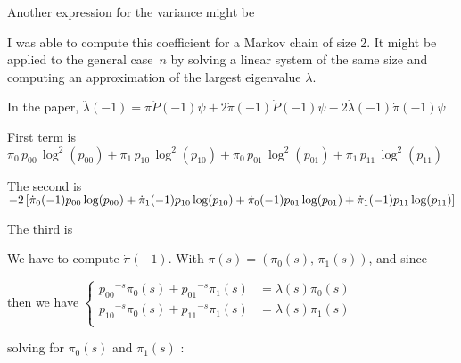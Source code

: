 
\noindent
Another expression for the variance might be


\noindent I was able to compute this coefficient for a Markov chain of size 2. It 
might be applied to the general case~$n$ by solving a linear system of the same size
and computing an approximation of the largest eigenvalue $\lambda$. 

\leftcenters
    {In the paper,}
    {$ \ddot{\lambda}(-1) = \pi \ddot{P}(-1)\psi
                        + 2 \dot{\pi}(-1) \dot{P}(-1) \psi
                        - 2 \dot{\lambda}(-1) \dot{\pi}(-1) \psi $}


\noindent First term is
\centers
    { $\pi_0 \, p_{0 0} \, \log^2 (p_{0 0}) 
        + \pi_1 \, p_{1 0} \, \log^2 (p_{1 0}) 
        + \pi_0 \, p_{0 1} \, \log^2 (p_{0 1}) 
        + \pi_1 \, p_{1 1} \, \log^2 (p_{1 1})  $}

\noindent The second is
\centers
    { $ - 2 \pac{
            \dot{\pi}_0(-1) p_{0 0} \log (p_{0 0})    
            + \dot{\pi}_1(-1) p_{1 0} \log (p_{1 0}) 
            + \dot{\pi}_0(-1) p_{0 1} \log (p_{0 1})
            + \dot{\pi}_1(-1) p_{1 1} \log (p_{1 1})
        }   
    $}

\noindent The third is

\noindent We 
        have to compute $\dot{\pi}(-1)$. With 
            $\pi(s) = (\pi_0(s), \, \pi_1(s))$, and since


\leftcenters
    {then we have}
    {$ \left\{
        \begin{aligned}
            {p_{0 0}}^{-s} \pi_0(s) + {p_{0 1}}^{-s} \pi_1(s) &= \lambda(s) \pi_0(s) \\
            {p_{1 0}}^{-s} \pi_0(s) + {p_{1 1}}^{-s} \pi_1(s) &= \lambda(s) \pi_1(s) \\
        \end{aligned}
        \right.
     $}

\noindent
solving for $\pi_0(s)$ and $\pi_1(s)$ :



